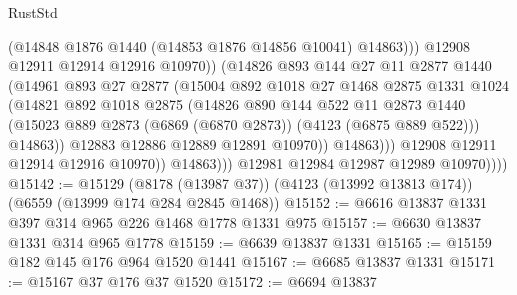 \begin{lexlean}{RustStd}
\begin{coremodule}
                                  (@14848 @1876 @1440 (@14853 @1876 @14856 @10041) @14863)))
                              @12908
                              @12911
                              @12914
                              @12916
                              @10970))
                          (@14826
                            @893
                            @144
                            @27
                            @11
                            @2877
                            @1440
                            (@14961
                              @893
                              @27
                              @2877
                              (@15004
                                @892
                                @1018
                                @27
                                @1468
                                @2875
                                @1331
                                @1024
                                (@14821
                                  @892
                                  @1018
                                  @2875
                                  (@14826
                                    @890
                                    @144
                                    @522
                                    @11
                                    @2873
                                    @1440
                                    (@15023
                                      @889
                                      @2873
                                      (@6869 (@6870 @2873))
                                      (@4123 (@6875 @889 @522)))
                                    @14863))
                                @12883
                                @12886
                                @12889
                                @12891
                                @10970))
                            @14863)))
                      @12908
                      @12911
                      @12914
                      @12916
                      @10970))
                  @14863)))
            @12981
            @12984
            @12987
            @12989
            @10970))))
@15142 := @15129
    (@8178 (@13987 @37))
    (@4123 (@13992 @13813 @174))
    (@6559 (@13999 @174 @284 @2845 @1468))
@15152 := @6616 @13837 @1331 @397 @314 @965 @226 @1468 @1778 @1331 @975
@15157 := @6630 @13837 @1331 @314 @965 @1778
@15159 := @6639 @13837 @1331
@15165 := @15159 @182 @145 @176 @964 @1520 @1441
@15167 := @6685 @13837 @1331
@15171 := @15167 @37 @176 @37 @1520
@15172 := @6694 @13837

\end{coremodule}
\end{lexlean}

